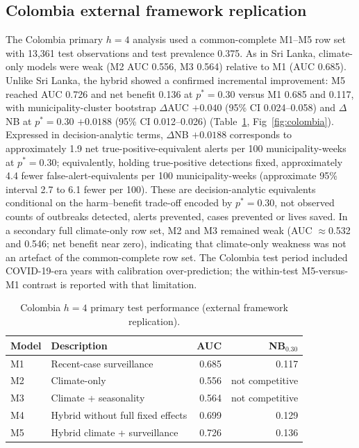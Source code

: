 \documentclass[11pt,a4paper]{article}
\begin{document}
\subsection{Colombia external framework replication}
The Colombia primary $h=4$ analysis used a common-complete M1--M5 row set with 13{,}361 test observations and test prevalence 0.375. As in Sri Lanka, climate-only models were weak (M2 AUC 0.556, M3 0.564) relative to M1 (AUC 0.685). Unlike Sri Lanka, the hybrid showed a confirmed incremental improvement: M5 reached AUC 0.726 and net benefit 0.136 at $p^*=0.30$ versus M1 0.685 and 0.117, with municipality-cluster bootstrap $\Delta$AUC $+0.040$ (95\% CI 0.024--0.058) and $\Delta$NB at $p^*=0.30$ $+0.0188$ (95\% CI 0.012--0.026) (Table~\ref{tab:colombia}, Fig~\ref{fig:colombia}). Expressed in decision-analytic terms, $\Delta$NB $+0.0188$ corresponds to approximately 1.9 net true-positive-equivalent alerts per 100 municipality-weeks at $p^*=0.30$; equivalently, holding true-positive detections fixed, approximately 4.4 fewer false-alert-equivalents per 100 municipality-weeks (approximate 95\% interval 2.7 to 6.1 fewer per 100). These are decision-analytic equivalents conditional on the harm--benefit trade-off encoded by $p^*=0.30$, not observed counts of outbreaks detected, alerts prevented, cases prevented or lives saved. In a secondary full climate-only row set, M2 and M3 remained weak (AUC $\approx$0.532 and 0.546; net benefit near zero), indicating that climate-only weakness was not an artefact of the common-complete row set. The Colombia test period included COVID-19-era years with calibration over-prediction; the within-test M5-versus-M1 contrast is reported with that limitation.

\begin{table}[htbp]
\centering
\caption{Colombia $h=4$ primary test performance (external framework replication).}
\label{tab:colombia}
\small
\begin{tabular}{llrr}
\toprule
Model & Description & AUC & NB$_{0.30}$ \\
\midrule
M1 & Recent-case surveillance & 0.685 & 0.117 \\
M2 & Climate-only & 0.556 & not competitive \\
M3 & Climate + seasonality & 0.564 & not competitive \\
M4 & Hybrid without full fixed effects & 0.699 & 0.129 \\
M5 & Hybrid climate + surveillance & 0.726 & 0.136 \\
\bottomrule
\end{tabular}
\end{table}
\end{document}

